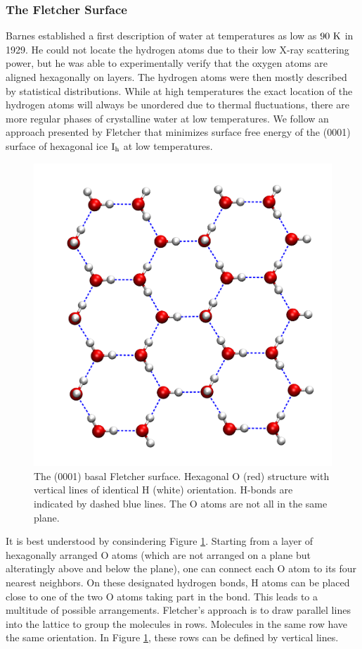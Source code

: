 \subsubsection{The Fletcher Surface}
Barnes established a first description of water at temperatures as low as $90{~\text{K}}$
in 1929.\cite{Barnes1929} He could not locate the hydrogen atoms due
to their low X-ray scattering power,\cite{Fletcher1966} but he was able
to experimentally verify that the oxygen atoms are aligned hexagonally
on layers. The hydrogen atoms were then mostly described by statistical
distributions. While at high temperatures the exact location of the hydrogen
atoms will always be unordered due to thermal fluctuations, there are
more regular phases of crystalline water at low temperatures.
We follow an approach presented by Fletcher that minimizes
surface free energy of the (0001) surface of hexagonal ice $\text I_\text h$ at low
temperatures.\cite{Fletcher1992}

\begin{figure}[t]
\centering
\includegraphics[width=.8\textwidth]{./img/FletcherAboveGlossyNoCueing.png}
\caption{The (0001) basal Fletcher surface. Hexagonal O (red) structure with
vertical lines of identical H (white) orientation. H-bonds are indicated by dashed blue lines.
The O atoms are not all in the same plane.}
\label{Fig:Ads:Fletcher}
\end{figure}

It is best understood by consindering Figure \ref{Fig:Ads:Fletcher}. Starting
from a layer of hexagonally arranged O atoms (which are not arranged on a plane but 
alteratingly above and below the plane), one can connect each O atom to its
four nearest neighbors. On these designated hydrogen bonds, H atoms can be placed close
to one of the two O atoms taking part in the bond. This leads to a multitude
of possible arrangements. Fletcher's approach is to draw parallel
lines into the lattice to group the molecules in rows. Molecules in the
same row have the same orientation. In Figure \ref{Fig:Ads:Fletcher}, these
rows can be defined by vertical lines.


